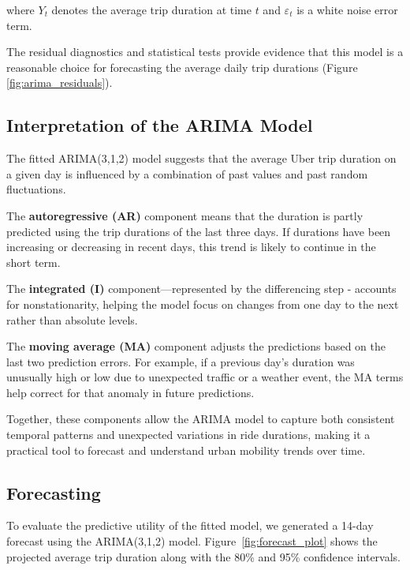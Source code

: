 \documentclass{article}
\begin{document}
where \( Y_t \) denotes the average trip duration at time \( t \) and \( \varepsilon_t \) is a white noise error term.

The residual diagnostics and statistical tests provide evidence that this model is a reasonable choice for forecasting the average daily trip durations (Figure \ref{fig:arima_residuals}).

\subsection{Interpretation of the ARIMA Model}

The fitted ARIMA(3,1,2) model suggests that the average Uber trip duration on a given day is influenced by a combination of past values and past random fluctuations. 

The \textbf{autoregressive (AR)} component means that the duration is partly predicted using the trip durations of the last three days. If durations have been increasing or decreasing in recent days, this trend is likely to continue in the short term. 

The \textbf{integrated (I)} component—represented by the differencing step - accounts for nonstationarity, helping the model focus on changes from one day to the next rather than absolute levels.

The \textbf{moving average (MA)} component adjusts the predictions based on the last two prediction errors. For example, if a previous day's duration was unusually high or low due to unexpected traffic or a weather event, the MA terms help correct for that anomaly in future predictions.

Together, these components allow the ARIMA model to capture both consistent temporal patterns and unexpected variations in ride durations, making it a practical tool to forecast and understand urban mobility trends over time.


\subsection{Forecasting}

To evaluate the predictive utility of the fitted model, we generated a 14-day forecast using the ARIMA(3,1,2) model. Figure~\ref{fig:forecast_plot} shows the projected average trip duration along with the 80\% and 95\% confidence intervals.
\end{document}
